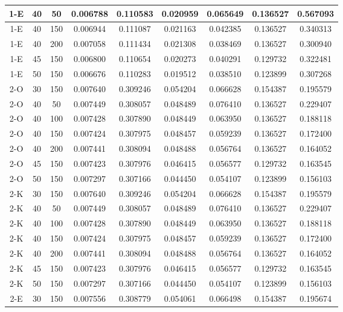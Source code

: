 \begin{center}
\begin{longtable}{|c|c|c|c|c|c|c|c|c|}
	\hline 1-E &	40 &	50  &	0.006788 &	0.110583 &	0.020959 &	0.065649 &	0.136527 &	0.567093 \\
	\hline \rowcolor{acceptable} 1-E &	40 &	150 &	0.006944 &	0.111087 &	0.021163 &	0.042385 &	0.136527 &	0.340313 \\
	\hline \rowcolor{acceptable} 1-E &	40 &	200 &	0.007058 &	0.111434 &	0.021308 &	0.038469 &	0.136527 &	0.300940 \\
	\hline 1-E &	45 &	150 &	0.006800 &	0.110654 &	0.020273 &	0.040291 &	0.129732 &	0.322481 \\
	\hline \rowcolor{acceptable} 1-E &	50 &	150 &	0.006676 &	0.110283 &	0.019512 &	0.038510 &	0.123899 &	0.307268 \\	
	\hline 2-O &	30 &	150 &	0.007640 &	0.309246 &	0.054204 &	0.066628 &	0.154387 &	0.195579 \\
	\hline 2-O &	40 &	50	&	0.007449 &	0.308057 &	0.048489 &	0.076410 &	0.136527 &	0.229407 \\
	\hline 2-O &	40 &	100	&	0.007428 &	0.307890 &	0.048449 &	0.063950 &	0.136527 &	0.188118 \\
	\hline 2-O &	40 &	150	& 	0.007424 &	0.307975 &	0.048457 &	0.059239 &	0.136527 &	0.172400 \\
	\hline 2-O &	40 &	200	&	0.007441 &	0.308094 &	0.048488 &	0.056764 &	0.136527 &	0.164052 \\
	\hline 2-O &	45 &	150	&	0.007423 &	0.307976 &	0.046415 &	0.056577 &	0.129732 &	0.163545 \\
	\hline 2-O &	50 &	150	&	0.007297 &	0.307166 &	0.044450 &	0.054107 &	0.123899 &	0.156103 \\
	\hline 2-K &	30 &	150	&	0.007640 &	0.309246 &	0.054204 &	0.066628 &	0.154387 &	0.195579 \\
	\hline 2-K &	40 &	50	&	0.007449 &	0.308057 &	0.048489 &	0.076410 &	0.136527 &	0.229407 \\
	\hline 2-K &	40 &	100	&	0.007428 &	0.307890 &	0.048449 &	0.063950 &	0.136527 &	0.188118 \\
	\hline 2-K &	40 &	150	&	0.007424 &	0.307975 &	0.048457 &	0.059239 &	0.136527 &	0.172400 \\
	\hline 2-K &	40 &	200	&	0.007441 &	0.308094 &	0.048488 &	0.056764 &	0.136527 &	0.164052 \\
	\hline 2-K &	45 &	150	&	0.007423 &	0.307976 &	0.046415 &	0.056577 &	0.129732 &	0.163545 \\
	\hline 2-K &	50 &	150	&	0.007297 &	0.307166 &	0.044450 &	0.054107 &	0.123899 &	0.156103 \\
	\hline 2-E &	30 &	150	&	0.007556 &	0.308779 &	0.054061 &	0.066498 &	0.154387 &	0.195674 \\

\end{longtable}
\end{center}
